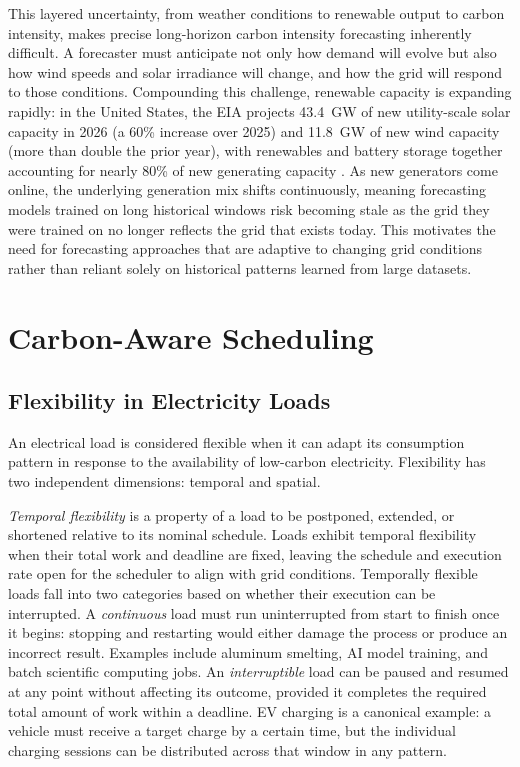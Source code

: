 This layered uncertainty, from weather conditions to renewable output to carbon intensity, makes precise long-horizon carbon intensity forecasting inherently difficult.
A forecaster must anticipate not only how demand will evolve but also how wind speeds and solar irradiance will change, and how the grid will respond to those conditions.
Compounding this challenge, renewable capacity is expanding rapidly: in the United States, the EIA projects 43.4~GW of new utility-scale solar capacity in 2026 (a 60\% increase over 2025) and 11.8~GW of new wind capacity (more than double the prior year), with renewables and battery storage together accounting for nearly 80\% of new generating capacity \cite{eia_capacity_2026}.
As new generators come online, the underlying generation mix shifts continuously, meaning forecasting models trained on long historical windows risk becoming stale as the grid they were trained on no longer reflects the grid that exists today.
This motivates the need for forecasting approaches that are adaptive to changing grid conditions rather than reliant solely on historical patterns learned from large datasets.

\section{Carbon-Aware Scheduling}

\subsection{Flexibility in Electricity Loads}

An electrical load is considered flexible when it can adapt its consumption pattern in response to the availability of low-carbon electricity.
Flexibility has two independent dimensions: temporal and spatial.

\textit{Temporal flexibility} is a property of a load to be postponed, extended, or shortened relative to its nominal schedule.
Loads exhibit temporal flexibility when their total work and deadline are fixed, leaving the schedule and execution rate open for the scheduler to align with grid conditions.
Temporally flexible loads fall into two categories based on whether their execution can be interrupted.
A \textit{continuous} load must run uninterrupted from start to finish once it begins: stopping and restarting would either damage the process or produce an incorrect result.
Examples include aluminum smelting, AI model training, and batch scientific computing jobs.
An \textit{interruptible} load can be paused and resumed at any point without affecting its outcome, provided it completes the required total amount of work within a deadline.
EV charging is a canonical example: a vehicle must receive a target charge by a certain time, but the individual charging sessions can be distributed across that window in any pattern.

